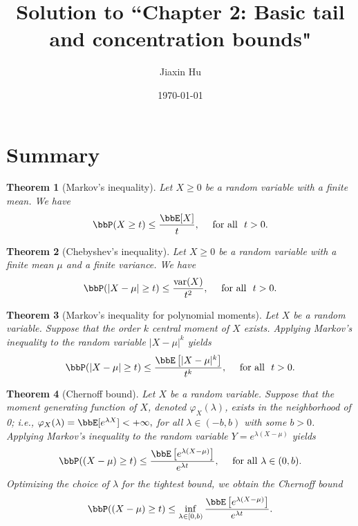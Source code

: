 \documentclass[11pt]{article}
\title{Solution to ``Chapter 2: Basic tail and concentration bounds"}
\date{\today}
\author{%
Jiaxin Hu
}
\DeclareMathOperator{\var}{var}
\theoremstyle{plain}
\newtheorem{thm}{Theorem}[section]
\theoremstyle{definition}
\begin{document}

\maketitle

\section{Summary}
\begin{thm}[Markov's inequality]\label{thm:markov}
	Let $X \geq 0$ be a random variable  with a finite mean. We have
	\begin{equation}\label{eq:thmmarkov}
		\bbP(X\geq t) \leq \frac{\bbE[X]}{t},\quad \text{ for all } \ t > 0.
	\end{equation}  
\end{thm}

\begin{thm}[Chebyshev's inequality]\label{thm:cheb}
	Let $X \geq 0$ be a random variable  with a finite mean $\mu$ and a finite variance. We have
	\begin{equation}\label{eq:cheby}
		\bbP(|X - \mu |\geq t) \leq \frac{\var(X)}{t^2},\quad \text{ for all } \ t > 0.
	\end{equation}  
\end{thm}

\begin{thm}[Markov's inequality for polynomial moments]\label{thm:polymoment}
	Let $X$ be a random variable. Suppose that the order $k$ central moment of $X$ exists. Applying Markov's inequality to the random variable $|X - \mu|^k$ yields
	\begin{equation}\label{eq:poly}
		\bbP(|X - \mu |\geq t) \leq \frac{\bbE\left[|X-\mu|^k\right]}{t^k},\quad \text{ for all } \ t > 0.
	\end{equation}  
\end{thm}

\begin{thm}[Chernoff bound]\label{thm:chernoff}
 Let $X$ be a random variable. Suppose that the moment generating function of $X$, denoted $\varphi_X(\lambda)$, exists in the neighborhood of 0; i.e., $\varphi_X(\lambda) = \bbE[e^{\lambda X}] < +\infty,$ for all $\lambda \in (-b,b)$ with some $b>0$. Applying Markov's inequality to the random variable $Y = e^{\lambda(X- \mu)}$ yields
	\begin{equation}\label{eq:chernoff1}
		\bbP((X - \mu) \geq t) \leq \frac{\bbE\left[e^{\lambda (X-\mu)}\right]}{e^{\lambda t}}, \quad \text{ for all } \lambda\in (0,b).
	\end{equation}
	Optimizing the choice of $\lambda$ for the tightest bound, we obtain the Chernoff bound
	\begin{equation}\label{eq:chernoff2}
		\bbP((X - \mu) \geq t) \leq \inf_{\lambda \in [0,b)} \frac{\bbE\left[e^{\lambda (X-\mu)}\right]}{e^{\lambda t}}.
	\end{equation}
\end{thm}
\end{document}
